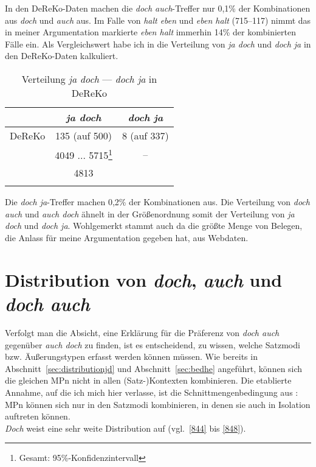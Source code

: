 {In den DeReKo-Daten machen die \textit{doch auch}-Treffer nur 0,1\% der Kombinationen aus \textit{doch} und \textit{auch} aus. Im Falle von \textit{halt eben} und \textit{eben halt} (715--117) nimmt das in meiner Argumentation markierte \textit{eben halt} immerhin 14\% der kombinierten Fälle ein. Als Vergleichswert habe ich in  die Verteilung von \textit{ja doch} und \textit{doch ja} in den DeReKo-Daten kalkuliert. 

\begin{table}
	\caption{\label{tab:843}Verteilung \textit{ja doch} --- \textit{doch ja} in DeReKo}
	\begin{tabular}[t]{ccc}
	\lsptoprule
	& \textit{ja doch} & \textit{doch ja}\\\midrule
	DeReKo & 135 ({auf 500}) & 8 (auf 337)\\
	& 4049 ... 5715\footnote{Gesamt: 95\%-Konfidenzintervall} & --\\
	& 4813 & \\
	\lspbottomrule			 
    \end{tabular}    
\end{table}	
Die \textit{doch ja}-Treffer machen 0,2\% der Kombinationen aus. Die Verteilung von \textit{doch auch} und \textit{auch doch} ähnelt in der Größenordnung somit der Verteilung von \textit{ja doch} und \textit{doch ja}. Wohlgemerkt stammt auch da die größte Menge von Belegen, die Anlass für meine Argumentation gegeben hat, aus Webdaten. 

\section{Distribution von \textit{doch}, \textit{auch} und \textit{doch auch}}
\label{sec:distributionda}
Verfolgt man die Absicht, eine Erklärung für die Präferenz von \textit{doch auch} gegenüber \textit{auch doch} zu finden, ist es entscheidend, zu wissen, welche Satzmodi  bzw. Äuße\-rungstypen  erfasst werden können müssen. Wie bereits in Abschnitt~\ref{sec:distributionjd} und Abschnitt~\ref{sec:bedhe} angeführt, können sich die gleichen MPn nicht in allen \mbox{(Satz-)}Kon\-tex\-ten kombinieren. Die etablierte Annahme, auf die ich mich hier verlasse, ist die Schnittmengenbedingung  aus \citet{Thurmair1989, Thurmair1991}: MPn können sich nur in den Satzmodi kombinieren, in denen sie auch in Isolation auftreten können.\\

\noindent
\textit{Doch} weist eine sehr weite Distribution auf (vgl.\ \ref{844} bis \ref{848}).

}
